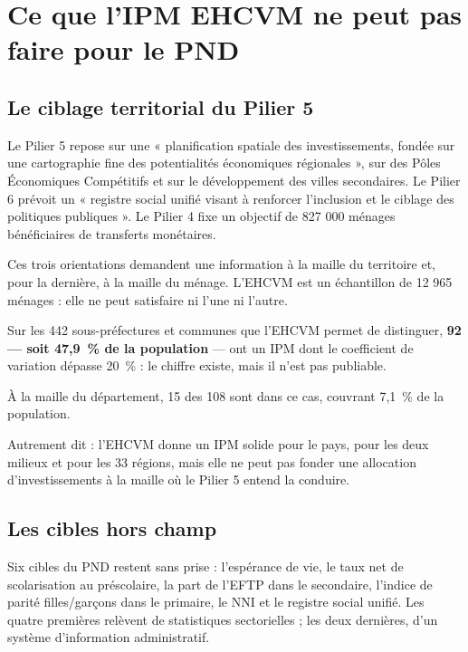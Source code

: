 \documentclass[11pt,a4paper]{article}
\begin{document}
\section{Ce que l'IPM EHCVM ne peut pas faire pour le PND}

\subsection{Le ciblage territorial du Pilier 5}

Le Pilier 5 repose sur une « planification spatiale des investissements, fondée sur une
cartographie fine des potentialités économiques régionales », sur des Pôles Économiques Compétitifs
et sur le développement des villes secondaires. Le Pilier 6 prévoit un « registre social unifié
visant à renforcer l'inclusion et le ciblage des politiques publiques ». Le Pilier 4 fixe un
objectif de 827 000 ménages bénéficiaires de transferts monétaires.

Ces trois orientations demandent une information à la maille du territoire et, pour la dernière, à
la maille du ménage. L'EHCVM est un échantillon de 12 965 ménages : elle ne peut satisfaire ni
l'une ni l'autre.

\begin{attention}
Sur les 442 sous-préfectures et communes que l'EHCVM permet de distinguer, \textbf{92 --- soit
47,9~\% de la population} --- ont un IPM dont le coefficient de variation dépasse 20~\% : le
chiffre existe, mais il n'est pas publiable.

À la maille du département, 15 des 108 sont dans ce cas, couvrant 7,1~\% de la population.

Autrement dit : l'EHCVM donne un IPM solide pour le pays, pour les deux milieux et pour les 33
régions, mais elle ne peut pas fonder une allocation d'investissements à la maille où le Pilier 5
entend la conduire.
\end{attention}

\subsection{Les cibles hors champ}

Six cibles du PND restent sans prise : l'espérance de vie, le taux net de scolarisation au
préscolaire, la part de l'EFTP dans le secondaire, l'indice de parité filles/garçons dans le
primaire, le NNI et le registre social unifié. Les quatre premières relèvent de statistiques
sectorielles ; les deux dernières, d'un système d'information administratif.
\end{document}
